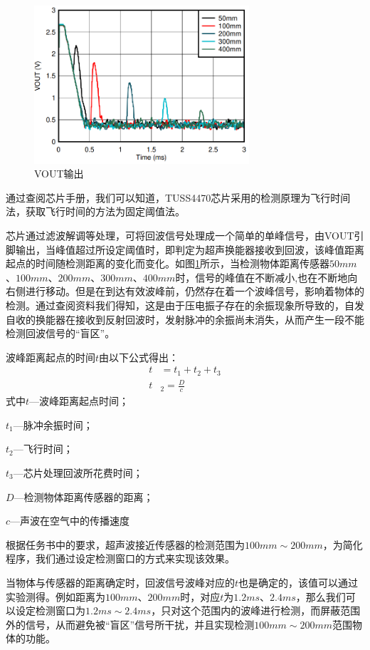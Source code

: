     \begin{figure}[!h]
     	\centering
    	\includegraphics[width=8cm]{figure/VOUT image.png}
    	\caption{VOUT输出}
    	\label{VOUT输出}
    \end{figure}\par
    通过查阅芯片手册，我们可以知道，TUSS4470芯片采用的检测原理为飞行时间法，获取飞行时间的方法为固定阈值法。\par
    芯片通过滤波解调等处理，可将回波信号处理成一个简单的单峰信号，由VOUT引脚输出，当峰值超过所设定阈值时，即判定为超声换能器接收到回波，该峰值距离起点的时间随检测距离的变化而变化。如图\ref{VOUT输出}所示，当检测物体距离传感器$50mm$、$100mm$、$200mm$、$300mm$、$400mm$时，信号的峰值在不断减小,也在不断地向右侧进行移动。但是在到达有效波峰前，仍然存在着一个波峰信号，影响着物体的检测。通过查阅资料我们得知，这是由于压电振子存在的余振现象所导致的，自发自收的换能器在接收到反射回波时，发射脉冲的余振尚未消失，从而产生一段不能检测回波信号的“盲区”。\par
    波峰距离起点的时间$t$由以下公式得出：       
    \begin{align}
    	t&=t_1+t_2+t_3 \\
    	t&_2=\frac{D}{c}
    	\label{检测周期公式}
    \end{align}  
式中\quad$t$---波峰距离起点时间；\par
    \quad$t_1$---脉冲余振时间；\par
    \quad$t_2$---飞行时间；\par    
    \quad$t_3$---芯片处理回波所花费时间；\par 
    \quad$D$---检测物体距离传感器的距离；\par  
    \quad$c$---声波在空气中的传播速度\par    
    根据任务书中的要求，超声波接近传感器的检测范围为$100mm\sim200mm$，为简化程序，我们通过设定检测窗口的方式来实现该效果。\par  
    当物体与传感器的距离确定时，回波信号波峰对应的$t$也是确定的，该值可以通过实验测得。例如距离为$100mm$、$200mm$时，对应$t$为$1.2ms$、$2.4ms$，那么我们可以设定检测窗口为$1.2ms\sim2.4ms$，只对这个范围内的波峰进行检测，而屏蔽范围外的信号，从而避免被“盲区”信号所干扰，并且实现检测$100mm\sim200mm$范围物体的功能。\par
    
